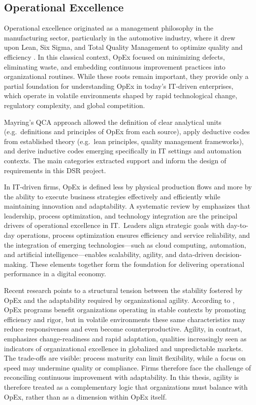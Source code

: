 \subsection{Operational Excellence}\label{subsec:op-ex}
Operational excellence originated as a management philosophy in the manufacturing sector, particularly in the automotive industry, where it drew upon Lean, Six Sigma, and Total Quality Management to optimize quality and efficiency \parencite{juranQuality1999, womackLean2013}. In this classical context, OpEx focused on minimizing defects, eliminating waste, and embedding continuous improvement practices into organizational routines. While these roots remain important, they provide only a partial foundation for understanding OpEx in today's IT-driven enterprises, which operate in volatile environments shaped by rapid technological change, regulatory complexity, and global competition.

Mayring's QCA approach allowed the definition of clear analytical units (e.g.~definitions and principles of OpEx from each source), apply deductive codes from established theory (e.g.~lean principles, quality management frameworks), and derive inductive codes emerging specifically in IT settings and automation contexts. The main categories extracted support and inform the design of requirements in this DSR project.

In IT-driven firms, OpEx is defined less by physical production flows and more by the ability to execute business strategies effectively and efficiently while maintaining innovation and adaptability. A systematic review by \textcite{owoadeSystematic2024} emphasizes that leadership, process optimization, and technology integration are the principal drivers of operational excellence in IT.~Leaders align strategic goals with day-to-day operations, process optimization ensures efficiency and service reliability, and the integration of emerging technologies---such as cloud computing, automation, and artificial intelligence---enables scalability, agility, and data-driven decision-making. These elements together form the foundation for delivering operational performance in a digital economy.

Recent research points to a structural tension between the stability fostered by OpEx and the adaptability required by organizational agility. According to \textcite{carvalhoOperational2023}, OpEx programs benefit organizations operating in stable contexts by promoting efficiency and rigor, but in volatile environments these same characteristics may reduce responsiveness and even become counterproductive. Agility, in contrast, emphasizes change-readiness and rapid adaptation, qualities increasingly seen as indicators of organizational excellence in globalized and unpredictable markets. The trade-offs are visible: process maturity can limit flexibility, while a focus on speed may undermine quality or compliance. Firms therefore face the challenge of reconciling continuous improvement with adaptability. In this thesis, agility is therefore treated as a complementary logic that organizations must balance with OpEx, rather than as a dimension within OpEx itself.

